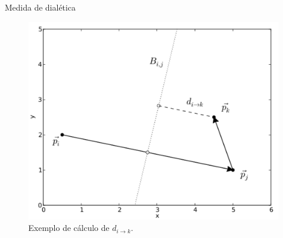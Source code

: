 \documentclass{beamer}
\begin{document}
\begin{frame}{Medida de dialética}


\begin{figure}[ht!]
\begin{center}
      \includegraphics[width=.7\textwidth]{figs/desc_dialetica2.pdf}
      \caption{Exemplo de cálculo de $d_{i \rightarrow k}$.}
        \label{fig:desc_dialetica}
\end{center}
\end{figure}
\end{frame}
\end{document}
